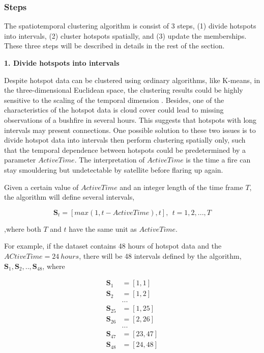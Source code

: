 \hypertarget{steps}{%
\subsubsection{Steps}\label{steps}}

The spatiotemporal clustering algorithm is consist of 3 steps, (1)
divide hotspots into intervals, (2) cluster hotspots spatially, and (3)
update the memberships. These three steps will be described in details
in the rest of the section.

\textbf{1. Divide hotspots into intervals}

Despite hotspot data can be clustered using ordinary algorithms, like
K-means, in the three-dimensional Euclidean space, the clustering
results could be highly sensitive to the scaling of the temporal
dimension \citep{kisilevich2009spatio}. Besides, one of the
characteristics of the hotspot data is cloud cover could lead to missing
observations of a bushfire in several hours. This suggests that hotspots
with long intervals may present connections. One possible solution to
these two issues is to divide hotspot data into intervals then perform
clustering spatially only, such that the temporal dependence between
hotspots could be predetermined by a parameter \(ActiveTime\). The
interpretation of \(ActiveTime\) is the time a fire can stay smouldering
but undetectable by satellite before flaring up again.

Given a certain value of \(ActiveTime\) and an integer length of the
time frame \(T\), the algorithm will define several intervals,

\[\boldsymbol{S}_t = [max(1,t-ActiveTime),t],~~t = 1,2,...,T\]

,where both \(T\) and \(t\) have the same unit as \(ActiveTime\).

For example, if the dataset contains 48 hours of hotspot data and the
\(ACtiveTime = 24~hours\), there will be 48 intervals defined by the
algorithm, \(\boldsymbol{S}_1,\boldsymbol{S}_2,..,\boldsymbol{S}_{48}\),
where

\begin{align*}
\boldsymbol{S}_1 &= [1,1]\\
\boldsymbol{S}_2 &= [1,2]\\
&...\\
\boldsymbol{S}_{25} &= [1,25]\\
\boldsymbol{S}_{26} &= [2,26]\\
&...\\
\boldsymbol{S}_{47} &= [23,47]\\
\boldsymbol{S}_{48} &= [24,48]
\end{align*}

